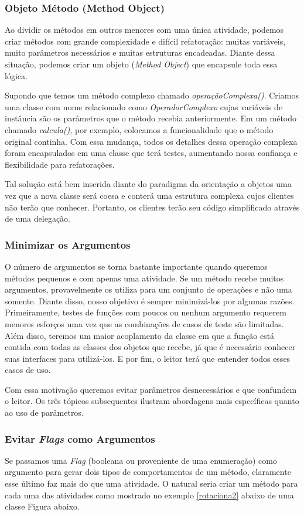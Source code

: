 \subsubsection{Objeto Método (Method Object)}
Ao dividir os métodos em outros menores com uma única atividade, podemos criar métodos com grande complexidade e difícil refatoração: muitas variáveis, muito parâmetros necessários e muitas estruturas encadeadas. Diante dessa situação, podemos criar um objeto (\textit{Method Object}) que encapsule toda essa lógica.
	
Supondo que temos um método complexo chamado \textit{operaçãoComplexa()}. Criamos uma classe com nome relacionado como \textit{OperadorComplexo} cujas variáveis de instância são os parâmetros que o método recebia anteriormente. Em um método chamado \textit{calcula()}, por exemplo, colocamos a funcionalidade que o método original continha. Com essa mudança, todos os detalhes dessa operação complexa foram encapsulados em uma classe que terá testes, aumentando nossa confiança e flexibilidade para refatorações.
	
Tal solução está bem inserida diante do paradigma da orientação a objetos uma vez que a nova classe será coesa e conterá uma estrutura complexa cujos clientes não terão que conhecer. Portanto, os clientes terão seu código simplificado através de uma delegação.

\subsubsection{Minimizar os Argumentos}
O número de argumentos se torna bastante importante quando queremos métodos pequenos e com apenas uma atividade. Se um método recebe muitos argumentos, provavelmente os utiliza para um conjunto de operações e não uma somente. Diante disso, nosso objetivo é sempre minimizá-los por algumas razões. Primeiramente, testes de funções com poucos ou nenhum argumento requerem menores esforços  uma vez que as combinações de casos de teste são limitadas. Além disso, teremos um maior acoplamento da classe em que a função está contida com todas as classes dos objetos que recebe, já que é necessário conhecer suas interfaces para utilizá-los. E por fim, o leitor terá que entender todos esses casos de uso.

Com essa motivação queremos evitar parâmetros desnecessários e que confundem o leitor. Os três tópicos subsequentes ilustram abordagens mais específicas quanto ao uso de parâmetros.

\subsubsection{Evitar \textit{Flags} como Argumentos}
Se passamos uma \textit{Flag} (booleana ou proveniente de uma enumeração) como argumento para gerar dois tipos de comportamentos de um método, claramente esse último faz mais do que uma atividade. O natural seria criar um método para cada uma das atividades como mostrado no exemplo \ref{rotaciona2} abaixo de uma classe Figura abaixo.

